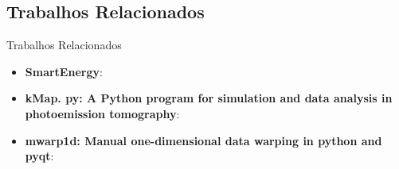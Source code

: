 \subsection{Trabalhos Relacionados}
\label{subsec:trabalhos}

\begin{frame}{Trabalhos Relacionados}
	\begin{itemize}
		\item \textbf{SmartEnergy}: \cite{SmartEnergy}
		\item \textbf{kMap. py: A Python program for simulation and data analysis in photoemission tomography}: \cite{brandstetter2021kmap}
		\item \textbf{mwarp1d: Manual one-dimensional data warping in python and pyqt}: \cite{pataky2019mwarp1d}
	\end{itemize}
\end{frame}
